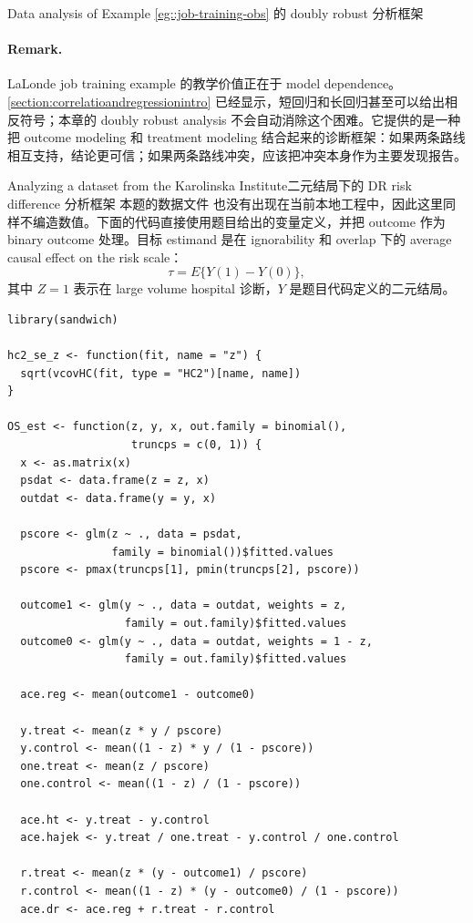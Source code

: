 \begin{exercisesolution}{Data analysis of Example \cref{eg::job-training-obs}}{ 的 doubly robust 分析框架}
\paragraph{Remark.}
LaLonde job training example 的教学价值正在于 model dependence。\cref{section:correlatioandregressionintro} 已经显示，短回归和长回归甚至可以给出相反符号；本章的 doubly robust analysis 不会自动消除这个困难。它提供的是一种把 outcome modeling 和 treatment modeling 结合起来的诊断框架：如果两条路线相互支持，结论更可信；如果两条路线冲突，应该把冲突本身作为主要发现报告。
\end{exercisesolution}

\begin{exercisesolution}{Analyzing a dataset from the Karolinska Institute}{二元结局下的 DR risk difference 分析框架}
本题的数据文件  也没有出现在当前本地工程中，因此这里同样不编造数值。下面的代码直接使用题目给出的变量定义，并把 outcome 作为 binary outcome 处理。目标 estimand 是在 ignorability 和 overlap 下的 average causal effect on the risk scale：
\[
\tau=E\{Y(1)-Y(0)\},
\]
其中 $Z=1$ 表示在 large volume hospital 诊断，$Y$ 是题目代码定义的二元结局。

\begin{lstlisting}
library(sandwich)

hc2_se_z <- function(fit, name = "z") {
  sqrt(vcovHC(fit, type = "HC2")[name, name])
}

OS_est <- function(z, y, x, out.family = binomial(),
                   truncps = c(0, 1)) {
  x <- as.matrix(x)
  psdat <- data.frame(z = z, x)
  outdat <- data.frame(y = y, x)

  pscore <- glm(z ~ ., data = psdat,
                family = binomial())$fitted.values
  pscore <- pmax(truncps[1], pmin(truncps[2], pscore))

  outcome1 <- glm(y ~ ., data = outdat, weights = z,
                  family = out.family)$fitted.values
  outcome0 <- glm(y ~ ., data = outdat, weights = 1 - z,
                  family = out.family)$fitted.values

  ace.reg <- mean(outcome1 - outcome0)

  y.treat <- mean(z * y / pscore)
  y.control <- mean((1 - z) * y / (1 - pscore))
  one.treat <- mean(z / pscore)
  one.control <- mean((1 - z) / (1 - pscore))

  ace.ht <- y.treat - y.control
  ace.hajek <- y.treat / one.treat - y.control / one.control

  r.treat <- mean(z * (y - outcome1) / pscore)
  r.control <- mean((1 - z) * (y - outcome0) / (1 - pscore))
  ace.dr <- ace.reg + r.treat - r.control


\end{lstlisting}
\end{exercisesolution}
